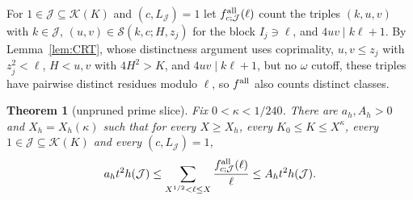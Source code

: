 \documentclass[10pt,reqno]{amsart}
\newtheorem{theorem}{Theorem}[section]
\theoremstyle{remark}
\newcommand{\K}{\mathcal K}
\newcommand{\J}{\mathcal J}
\newcommand{\Sset}{\mathcal S}
\begin{document}
For $1\in\J\subseteq\K(K)$ and $(c,L_{\J})=1$ let $f^{\rm all}_{c;\J}(\ell)$
count the triples $(k,u,v)$ with $k\in\J$, $(u,v)\in\Sset(k,c;H,z_j)$
for the block $I_j\ni\ell$, and $4uv\mid k\ell+1$.  By
Lemma~\ref{lem:CRT}, whose distinctness argument uses coprimality,
$u,v\leq z_j$ with $z_j^2<\ell$, $H<u,v$ with $4H^2>K$, and
$4uv\mid k\ell+1$, but no $\omega$ cutoff, these triples have
pairwise distinct residues modulo $\ell$, so $f^{\rm all}$ also counts
distinct classes.

\begin{theorem}[unpruned prime slice]\label{thm:unpruned}
Fix $0<\kappa<1/240$.  There are $a_h,A_h>0$ and $X_h=X_h(\kappa)$ such
that for every $X\geq X_h$, every $K_0\leq K\leq X^\kappa$, every
$1\in\J\subseteq\K(K)$ and every $(c,L_{\J})=1$,
\begin{equation}\label{eq:unpruned}
 a_ht^2h(\J)\leq\sum_{X^{1/2}<\ell\leq X}\frac{f^{\rm all}_{c;\J}(\ell)}{\ell}
 \leq A_ht^2h(\J).
\end{equation}
\end{theorem}
\end{document}
